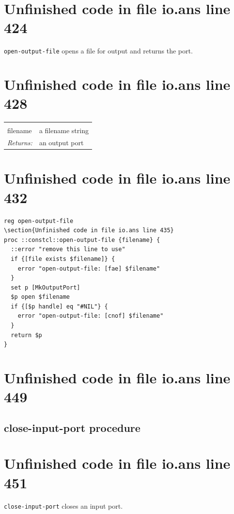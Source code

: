 \documentclass[twoside,9pt]{report}
\begin{document}
\section{Unfinished code in file io.ans line 424}


\texttt{open-output-file} opens a file for output and returns the port.

\section{Unfinished code in file io.ans line 428}
\noindent\begin{tabular}{ |p{1.9cm} p{8cm}| }
\hline
\rowcolor[HTML]{CCCCCC} \multicolumn{2}{|l|}{\bf open-output-file (public)} \\
filename & a filename string \\
\textit{Returns:} & an output port \\
\hline
\end{tabular}
\section{Unfinished code in file io.ans line 432}
\begin{lstlisting}
reg open-output-file
\section{Unfinished code in file io.ans line 435}
proc ::constcl::open-output-file {filename} {
  ::error "remove this line to use"
  if {[file exists $filename]} {
    error "open-output-file: [fae] $filename"
  }
  set p [MkOutputPort]
  $p open $filename
  if {[$p handle] eq "#NIL"} {
    error "open-output-file: [cnof] $filename"
  }
  return $p
}
\end{lstlisting}
\section{Unfinished code in file io.ans line 449}
\subsection{close-input-port procedure}
\label{close-input-port-procedure}
\section{Unfinished code in file io.ans line 451}


\texttt{close-input-port} closes an input port.
\end{document}
